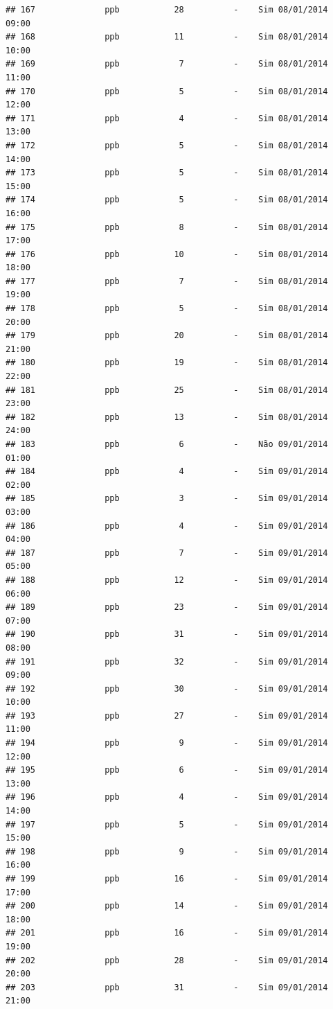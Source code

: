 \documentclass[]{book}
\begin{document}
\begin{verbatim}
## 167              ppb           28          -    Sim 08/01/2014 09:00
## 168              ppb           11          -    Sim 08/01/2014 10:00
## 169              ppb            7          -    Sim 08/01/2014 11:00
## 170              ppb            5          -    Sim 08/01/2014 12:00
## 171              ppb            4          -    Sim 08/01/2014 13:00
## 172              ppb            5          -    Sim 08/01/2014 14:00
## 173              ppb            5          -    Sim 08/01/2014 15:00
## 174              ppb            5          -    Sim 08/01/2014 16:00
## 175              ppb            8          -    Sim 08/01/2014 17:00
## 176              ppb           10          -    Sim 08/01/2014 18:00
## 177              ppb            7          -    Sim 08/01/2014 19:00
## 178              ppb            5          -    Sim 08/01/2014 20:00
## 179              ppb           20          -    Sim 08/01/2014 21:00
## 180              ppb           19          -    Sim 08/01/2014 22:00
## 181              ppb           25          -    Sim 08/01/2014 23:00
## 182              ppb           13          -    Sim 08/01/2014 24:00
## 183              ppb            6          -    Não 09/01/2014 01:00
## 184              ppb            4          -    Sim 09/01/2014 02:00
## 185              ppb            3          -    Sim 09/01/2014 03:00
## 186              ppb            4          -    Sim 09/01/2014 04:00
## 187              ppb            7          -    Sim 09/01/2014 05:00
## 188              ppb           12          -    Sim 09/01/2014 06:00
## 189              ppb           23          -    Sim 09/01/2014 07:00
## 190              ppb           31          -    Sim 09/01/2014 08:00
## 191              ppb           32          -    Sim 09/01/2014 09:00
## 192              ppb           30          -    Sim 09/01/2014 10:00
## 193              ppb           27          -    Sim 09/01/2014 11:00
## 194              ppb            9          -    Sim 09/01/2014 12:00
## 195              ppb            6          -    Sim 09/01/2014 13:00
## 196              ppb            4          -    Sim 09/01/2014 14:00
## 197              ppb            5          -    Sim 09/01/2014 15:00
## 198              ppb            9          -    Sim 09/01/2014 16:00
## 199              ppb           16          -    Sim 09/01/2014 17:00
## 200              ppb           14          -    Sim 09/01/2014 18:00
## 201              ppb           16          -    Sim 09/01/2014 19:00
## 202              ppb           28          -    Sim 09/01/2014 20:00
## 203              ppb           31          -    Sim 09/01/2014 21:00

\end{verbatim}
\end{document}
